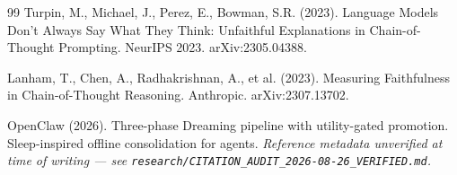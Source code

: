 \documentclass[11pt]{article}
\begin{document}
\begin{thebibliography}{99}
Turpin, M., Michael, J., Perez, E., Bowman, S.R. (2023).
Language Models Don't Always Say What They Think: Unfaithful Explanations in
Chain-of-Thought Prompting. NeurIPS 2023. arXiv:2305.04388.

Lanham, T., Chen, A., Radhakrishnan, A., et al. (2023).
Measuring Faithfulness in Chain-of-Thought Reasoning. Anthropic.
arXiv:2307.13702.

OpenClaw (2026). Three-phase Dreaming pipeline with utility-gated promotion.
Sleep-inspired offline consolidation for agents.
\emph{Reference metadata unverified at time of writing --- see
\texttt{research/CITATION\_AUDIT\_2026-08-26\_VERIFIED.md}.}

\end{thebibliography}
\end{document}
